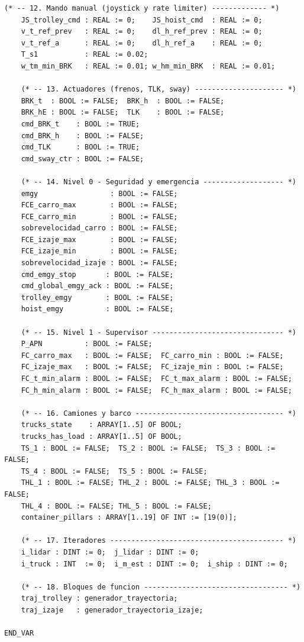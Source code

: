 \documentclass[12pt, a4paper]{article}
\begin{document}
\begin{lstlisting}[style=st, basicstyle=\ttfamily\scriptsize,
    caption={Variables globales (\texttt{GVL}) del proyecto CODESYS, organizadas por grupo funcional.},
    label=lst:gvl]
    (* -- 12. Mando manual (joystick y rate limiter) ------------- *)
    JS_trolley_cmd : REAL := 0;    JS_hoist_cmd  : REAL := 0;
    v_t_ref_prev   : REAL := 0;    dl_h_ref_prev : REAL := 0;
    v_t_ref_a      : REAL := 0;    dl_h_ref_a    : REAL := 0;
    T_s1           : REAL := 0.02;
    w_tm_min_BRK   : REAL := 0.01; w_hm_min_BRK  : REAL := 0.01;

    (* -- 13. Actuadores (frenos, TLK, sway) --------------------- *)
    BRK_t  : BOOL := FALSE;  BRK_h  : BOOL := FALSE;
    BRK_hE : BOOL := FALSE;  TLK    : BOOL := FALSE;
    cmd_BRK_t    : BOOL := TRUE;
    cmd_BRK_h    : BOOL := FALSE;
    cmd_TLK      : BOOL := TRUE;
    cmd_sway_ctr : BOOL := FALSE;

    (* -- 14. Nivel 0 - Seguridad y emergencia ------------------- *)
    emgy                 : BOOL := FALSE;
    FCE_carro_max        : BOOL := FALSE;
    FCE_carro_min        : BOOL := FALSE;
    sobrevelocidad_carro : BOOL := FALSE;
    FCE_izaje_max        : BOOL := FALSE;
    FCE_izaje_min        : BOOL := FALSE;
    sobrevelocidad_izaje : BOOL := FALSE;
    cmd_emgy_stop       : BOOL := FALSE;
    cmd_global_emgy_ack : BOOL := FALSE;
    trolley_emgy        : BOOL := FALSE;
    hoist_emgy          : BOOL := FALSE;

    (* -- 15. Nivel 1 - Supervisor ------------------------------- *)
    P_APN          : BOOL := FALSE;
    FC_carro_max   : BOOL := FALSE;  FC_carro_min : BOOL := FALSE;
    FC_izaje_max   : BOOL := FALSE;  FC_izaje_min : BOOL := FALSE;
    FC_t_min_alarm : BOOL := FALSE;  FC_t_max_alarm : BOOL := FALSE;
    FC_h_min_alarm : BOOL := FALSE;  FC_h_max_alarm : BOOL := FALSE;

    (* -- 16. Camiones y barco ----------------------------------- *)
    trucks_state    : ARRAY[1..5] OF BOOL;
    trucks_has_load : ARRAY[1..5] OF BOOL;
    TS_1 : BOOL := FALSE;  TS_2 : BOOL := FALSE;  TS_3 : BOOL := FALSE;
    TS_4 : BOOL := FALSE;  TS_5 : BOOL := FALSE;
    THL_1 : BOOL := FALSE; THL_2 : BOOL := FALSE; THL_3 : BOOL := FALSE;
    THL_4 : BOOL := FALSE; THL_5 : BOOL := FALSE;
    container_pillars : ARRAY[1..19] OF INT := [19(0)];

    (* -- 17. Iteradores ----------------------------------------- *)
    i_lidar : DINT := 0;  j_lidar : DINT := 0;
    i_truck : INT  := 0;  i_m_est : DINT := 0;  i_ship : DINT := 0;

    (* -- 18. Bloques de funcion ---------------------------------- *)
    traj_trolley : generador_trayectoria;
    traj_izaje   : generador_trayectoria_izaje;

END_VAR
\end{lstlisting}
\end{document}
